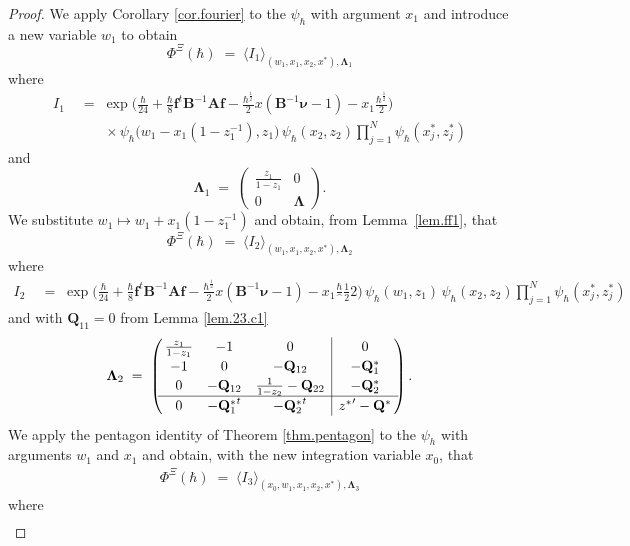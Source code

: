 \documentclass[12pt,reqno]{amsart}
\theoremstyle{definition}
\def\be{\begin{equation}}
\def\ee{\end{equation}}
\newcommand{\bea}{\begin{equation}\begin{aligned}}
\newcommand{\eea}{\end{aligned}\end{equation}}
\renewcommand{\=}{\;=\;}
\newcommand{\hsqrt}{\hbar^{\frac{1}{2}}}
\begin{document}
\begin{proof}
We apply Corollary \ref{cor.fourier} to the $\psi_\hbar$ with argument $ x_1$
and introduce a new variable $w_1$ to obtain
\be
\Phi^{\Xi}(\hbar) \= \langle I_1
\rangle_{(w_1, x_1, x_2,x^*),\mathbf \Lambda_1}
\ee
where
\begin{align*}
I_1 &\= \exp\Big(\frac{\hbar}{24}
+\frac\hbar8 \mathbf f^t \mathbf B^{-1} \mathbf A \mathbf f
-\frac{\hsqrt}2 x
(\mathbf B^{-1}\boldsymbol{\nu}-1)
-x_1\frac {\hsqrt}{2}\Big)\\
&\qquad\times\psi_{\hbar}\Big(w_1- x_1(1-z_1^{-1}) ,z_1\Big)\,
\psi_{\hbar}(x_2,z_2)
\prod_{j=1}^{N} \psi_{\hbar}( x_j^*, z_j^*)
\end{align*}
and
\[
\mathbf \Lambda_1 \=
\begin{pmatrix}
\frac {z_1} {1-z_1} & 0\\
0 & \mathbf \Lambda
\end{pmatrix}.
\]
We substitute $w_1 \mapsto w_1+ x_1(1-z_1^{-1})$ and obtain, from
Lemma~\ref{lem.ff1}, that
\be
\Phi^{\Xi}(\hbar) \=
\langle I_2 \rangle_{(w_1, x_1, x_2,x^*),\mathbf \Lambda_2}
\ee
where
\begin{align*}
I_2 &\=\exp\Big(\frac{\hbar}{24}
+\frac\hbar8 \mathbf f^t \mathbf B^{-1} \mathbf A \mathbf f
-\frac{\hsqrt}2 x
(\mathbf B^{-1}\boldsymbol{\nu}-1)
-x_1\frac \hsqrt2\Big)\,
\psi_{\hbar}(w_1,z_1)\,
\psi_{\hbar}(x_2,z_2)
\prod_{j=1}^{N} \psi_{\hbar}( x_j^*, z_j^*)
\end{align*}
and with $\mathbf Q_{11} = 0$ from Lemma \ref{lem.23.c1}
\[
\mathbf \Lambda_2 \= 
\left(\!\!
\def\arraystretch{1.15}
\begin{array}{ccc|c}
 \frac{z_1}{1-{z_1}} & -1 & 0 & 0 \\
 -1 & 0 & -{\mathbf Q_{12}} & -{\mathbf Q_1^*} \\
 0 & -{\mathbf Q_{12}} & \frac{1}{1-{z_2}}-{\mathbf Q_{22}} & -{\mathbf Q_2^*} \\
 \hline
 0 & -{\mathbf Q_1^*}^t & -{\mathbf Q_2^*}^t & {z^*}'-{\mathbf Q^*} \\
\end{array}
\!\!\right).
\]
We apply the pentagon identity of Theorem \ref{thm.pentagon} to the $\psi_h$
with arguments $w_1$ and $x_1$ and obtain, with the new integration variable $x_0$,
that
\bea
\Phi^{\Xi}(\hbar) \=
\langle I_3 \rangle_{(x_0,w_1, x_1, x_2,x^*),
\mathbf \Lambda_3}
\eea
where
\begin{align*}

\end{align*}
\end{proof}
\end{document}
